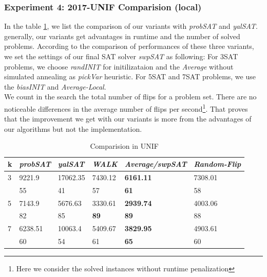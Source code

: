 \documentclass[12pt,a4paper,twoside]{scrartcl}
\numberwithin{equation}{section}
\begin{document}
\subsubsection{Experiment 4: 2017-UNIF Comparision (local)} 
\label{sec:Experiment 4}
In the table \ref{tab:UNIF}, we list the comparison of our variants with \emph{probSAT} and \emph{yalSAT}. generally, our variants get advantages in runtime and the number of solved problems.
According to the comparison of performances of these three variants,  we set the settings of our final SAT solver \emph{swpSAT} as following: For 3SAT problems, we choose \emph{randINIT} for initilizataion and the \emph{Average}  without simulated annealing as \emph{pickVar} heuristic. For 5SAT and 7SAT problems, we use the \emph{biasINIT} and \emph{Average-Local}.  \\
We count in the search the total number of flips for a problem set. There are no noticeable differences in the average number of flips per second\footnote{Here we consider the solved instances without runtime penalization}. That proves that the improvement we get with our variants is more from the advantages of our algorithms but not the implementation.
   \begin{table}[H]
   \label{tab:UNIF}
\begin{center}
    \begin{tabular}{|l|l|l|l|l|p{3cm}|}
\hline 

    k &\emph{probSAT}&\emph{yalSAT}&\emph{WALK}&\emph{Average/swpSAT}&\emph{Random-Flip} \\ \hline      
    3 &9221.9&17062.35&7430.12&\textbf{6161.11} &7308.01\\ 
    &55&41&57&\textbf{61}&58\\ \hline
    5& 7143.9&5676.63&3330.61&\textbf{2939.74}&4003.06\\ 
    &82&85&\textbf{89}&\textbf{89}&88\\ \hline
    7& 6238.51&10063.4&5409.67&\textbf{3829.95}&4903.61\\
    &60&54&61&\textbf{65}&60\\ \hline
	
\end{tabular}
\end{center}
\caption{Comparision in UNIF}
\end{table}
\end{document}
